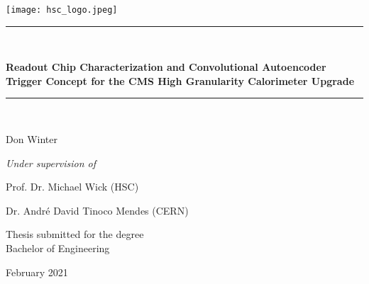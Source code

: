 \documentclass[a4paper, 12pt, twoside]{article}
\newcommand{\HRule}[1]{\rule{\linewidth}{#1}}
\begin{document}


\thispagestyle{empty}
\begin{center}
\begin{minipage}{\linewidth}
    \centering
    \texttt{[image: hsc\_logo.jpeg]}\par
    \vspace{3cm}
		\HRule{1pt} \\
		{\Large \textbf{Readout Chip Characterization and Convolutional Autoencoder Trigger Concept for the CMS High Granularity Calorimeter Upgrade}\par}
		\HRule{1pt} \\
    \vspace{3cm}
		{\Large Don Winter\par}
		{\Large \textit{Under supervision of}\par}
		{\Large Prof. Dr. Michael Wick (HSC)\par}
		{\Large Dr. Andr\'e David Tinoco Mendes (CERN)\par}
		\vspace{3cm}
    {\Large Thesis submitted for the degree\\Bachelor of Engineering\par}
    \vspace{3cm}
    {\Large February 2021}\par
\end{minipage}
\end{center}
\clearpage
\end{document}
